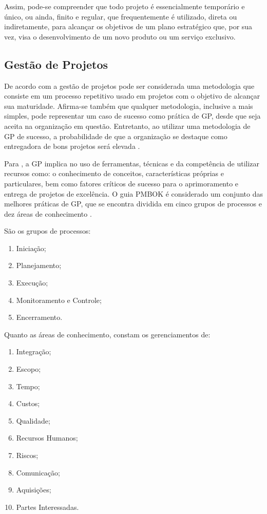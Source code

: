   Assim, pode-se compreender que todo projeto é essencialmente temporário e único, ou ainda, finito e regular, que frequentemente é utilizado, direta ou indiretamente, para alcançar os objetivos de um plano estratégico que, por sua vez, visa o desenvolvimento de um novo produto ou um serviço exclusivo.

\subsection{Gestão de Projetos}

  De acordo com  a gestão de projetos pode ser considerada uma metodologia que consiste em um processo repetitivo usado em projetos com o objetivo de alcançar sua maturidade. Afirma-se também que qualquer metodologia, inclusive a mais simples, pode representar um caso de sucesso como prática de GP, desde que seja aceita na organização em questão. Entretanto, ao utilizar uma metodologia de GP de sucesso, a probabilidade de que a organização se destaque como entregadora de bons projetos será elevada \cite{kerzner2013project}.

  Para , a GP implica no uso de ferramentas, técnicas e da competência de utilizar recursos como: o conhecimento de conceitos, características próprias e particulares, bem como fatores críticos de sucesso para o aprimoramento e entrega de projetos de excelência. O guia PMBOK é considerado um conjunto das melhores práticas de GP, que se encontra dividida em cinco grupos de processos e dez áreas de conhecimento \cite{pmiguide2014}.

  São os grupos de processos:
  \singlespacing
  \begin{enumerate}
    \item Iniciação;
    \item Planejamento;
    \item Execução;
    \item Monitoramento e Controle;
    \item Encerramento.
  \end{enumerate}
  \onehalfspacing

  Quanto as áreas de conhecimento, constam os gerenciamentos de:

  \singlespacing
  \begin{enumerate}
    \item Integração;
    \item Escopo;
    \item Tempo;
    \item Custos;
    \item Qualidade;
    \item Recursos Humanos;
    \item Riscos;
    \item Comunicação;
    \item Aquisições;
    \item Partes Interessadas.
  \end{enumerate}
  \onehalfspacing


